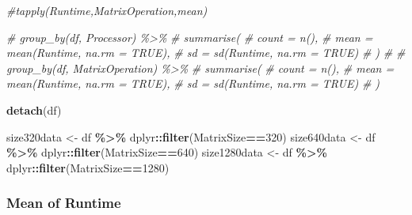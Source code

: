 \documentclass[
]{article}
\newenvironment{Shaded}{\begin{snugshade}}{\end{snugshade}}
\newcommand{\CommentTok}[1]{\textcolor[rgb]{0.56,0.35,0.01}{\textit{#1}}}
\newcommand{\DecValTok}[1]{\textcolor[rgb]{0.00,0.00,0.81}{#1}}
\newcommand{\KeywordTok}[1]{\textcolor[rgb]{0.13,0.29,0.53}{\textbf{#1}}}
\newcommand{\NormalTok}[1]{#1}
\newcommand{\OperatorTok}[1]{\textcolor[rgb]{0.81,0.36,0.00}{\textbf{#1}}}
\newcommand{\StringTok}[1]{\textcolor[rgb]{0.31,0.60,0.02}{#1}}
\begin{document}
\begin{Shaded}
\begin{Highlighting}[]
\CommentTok{\#tapply(Runtime,MatrixOperation,mean)}

\CommentTok{\# group\_by(df, Processor) \%\textgreater{}\%}
\CommentTok{\#   summarise(}
\CommentTok{\#     count = n(),}
\CommentTok{\#     mean = mean(Runtime, na.rm = TRUE),}
\CommentTok{\#     sd = sd(Runtime, na.rm = TRUE)}
\CommentTok{\#   )}
\CommentTok{\# }
\CommentTok{\# group\_by(df, MatrixOperation) \%\textgreater{}\%}
\CommentTok{\#   summarise(}
\CommentTok{\#     count = n(),}
\CommentTok{\#     mean = mean(Runtime, na.rm = TRUE),}
\CommentTok{\#     sd = sd(Runtime, na.rm = TRUE)}
\CommentTok{\#   )}

\KeywordTok{detach}\NormalTok{(df)}

\NormalTok{size320data \textless{}{-}}\StringTok{ }\NormalTok{df }\OperatorTok{\%\textgreater{}\%}\StringTok{ }\NormalTok{dplyr}\OperatorTok{::}\KeywordTok{filter}\NormalTok{(MatrixSize}\OperatorTok{==}\DecValTok{320}\NormalTok{)}
\NormalTok{size640data \textless{}{-}}\StringTok{ }\NormalTok{df }\OperatorTok{\%\textgreater{}\%}\StringTok{ }\NormalTok{dplyr}\OperatorTok{::}\KeywordTok{filter}\NormalTok{(MatrixSize}\OperatorTok{==}\DecValTok{640}\NormalTok{)}
\NormalTok{size1280data \textless{}{-}}\StringTok{ }\NormalTok{df }\OperatorTok{\%\textgreater{}\%}\StringTok{ }\NormalTok{dplyr}\OperatorTok{::}\KeywordTok{filter}\NormalTok{(MatrixSize}\OperatorTok{==}\DecValTok{1280}\NormalTok{)}
\end{Highlighting}
\end{Shaded}

\hypertarget{mean-of-runtime}{%
\subsubsection{Mean of Runtime}\label{mean-of-runtime}}

\begin{Shaded}
\end{Shaded}
\end{document}
